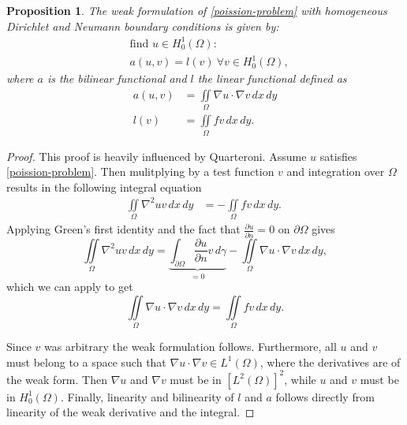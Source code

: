 \documentclass[5pt,a4paper,english]{elsarticle}%
\newtheorem{proposition}[theorem]{Proposition}
\begin{document}
\begin{proposition}
    The weak formulation of \eqref{poission-problem} with homogeneous Dirichlet and Neumann boundary conditions is given by:  
    \begin{equation*}
        \begin{aligned}
        &\text{find } u \in H_0^{1}(\Omega) : 
        \\
        &a(u,v) = l(v) \ \forall v \in H_0^{1}(\Omega), 
        \end{aligned}
    \end{equation*}
    where $a$ is the bilinear functional and $l$ the linear functional defined as 
    \begin{equation*}
        \begin{aligned}
            a(u,v) &= \iint\limits_{\Omega} \nabla u \cdot \nabla v \, dx \, dy
            \\
            l(v) &= \iint\limits_{\Omega} fv \, dx \, dy.
        \end{aligned}
    \end{equation*}
\end{proposition}
\begin{proof}
    This proof is heavily influenced by Quarteroni\cite[p. 44-45]{AQuart}.
    Assume $u$ satisfies \eqref{poission-problem}. Then mulitplying by a test function $v$ and integration over $\Omega$ results in the following integral equation
    \begin{equation}
        \label{weak-start}
        \begin{aligned}
            \iint\limits_{\Omega} \nabla^2uv \, dx \, dy &=  -\iint\limits_{\Omega} fv \, dx \, dy.\ 
        \end{aligned}
    \end{equation}
    Applying Green's first identity and the fact that $\frac{\partial u}{\partial n} = 0$ on $\partial \Omega$ gives
    \begin{equation}
        \iint\limits_{\Omega} \nabla^2 u v \, dx \, dy 
        = \underbrace{\int_{\partial \Omega} \frac{\partial u}{\partial n} v \, d\gamma}_{=0} - \iint\limits_{\Omega} \nabla u \cdot \nabla v  \, dx \, dy,
        \label{greens-identety}
    \end{equation}
    which we can apply to get 
    \begin{equation}
        \iint\limits_{\Omega} \nabla u \cdot \nabla v \, dx \, dy = 
        \iint\limits_{\Omega} fv \, dx \, dy.
    \end{equation}
    
    Since $v$ was arbitrary the weak formulation follows. Furthermore, all $u$ and $v$ must belong to a space such that $\nabla u \cdot \nabla v \in {L^1}(\Omega)$, where the derivatives are of the weak form. Then $\nabla u$ and $\nabla v$ must be in $\left[{L^2}(\Omega)\right]^2$, while $u$ and $v$ must be in ${H^1_0}(\Omega)$. Finally, linearity and bilinearity of $l$ and $a$ follows directly from linearity of the weak derivative and the integral.
\end{proof}
\end{document}
